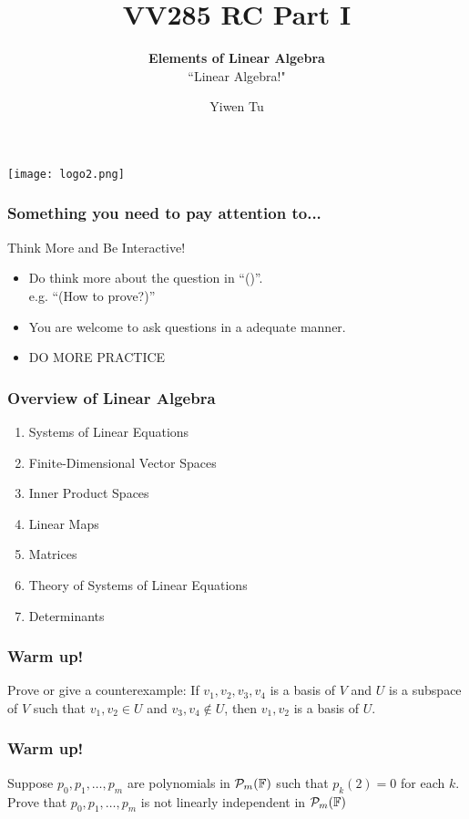 \documentclass[12pt, t]{beamer}
\title{VV285 RC Part I}
\subtitle{\textbf{Elements of Linear Algebra}\\``Linear Algebra!"}
\institute[UM-SJTU JI]{Univerity of Michigan-Shanghai Jiao Tong University Joint Institute}
\author{Yiwen Tu}
\begin{document}
\begin{frame}
    \titlepage
    \begin{center}
        \texttt{[image: logo2.png]}
    \end{center}
\end{frame}

\begin{frame}
    \frametitle{Something you need to pay attention to...}
    Think More and Be Interactive!
    \begin{itemize}
        \item Do think more about the question in ``()''. \\e.g. ``(How to prove?)''
        \item You are welcome to ask questions in a adequate manner.
        \item DO MORE PRACTICE
    \end{itemize}
    

\end{frame}

\begin{frame}
    
    \frametitle{Overview of Linear Algebra}
    \begin{enumerate}
        \item Systems of Linear Equations
        \item Finite-Dimensional Vector Spaces
        \item Inner Product Spaces
        \item Linear Maps
        \item Matrices
        \item Theory of Systems of Linear Equations
        \item Determinants
    \end{enumerate}
\end{frame}
   
\begin{frame}
    \frametitle{Warm up!}
    Prove or give a counterexample: If $v_1,v_2,v_3,v_4$ is a basis of $V$ and $U$ is a subspace of $V$ such that $v_1,v_2\in U$ and $v_3,v_4\notin U$, then $v_1,v_2$ is a basis of $U$.
\end{frame}

\begin{frame}
    \frametitle{Warm up!}
    Suppose $p_{0}, p_{1}, \ldots, p_{m}$ are polynomials in $\mathcal{P}_{m}(\mathbb{F})$ such that $p_{k}(2)=0$ for each $k.$ Prove that $p_{0}, p_{1}, \ldots, p_{m}$ is not linearly independent in $\mathcal{P}_{m}(\mathbb{F})$
\end{frame}
\end{document}
